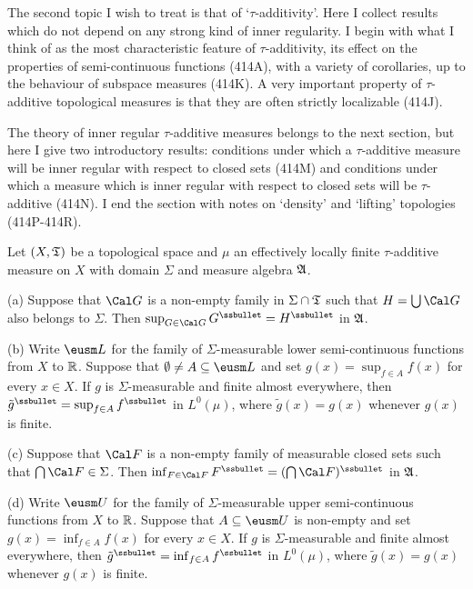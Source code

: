 
\def\chaptername{Topologies and measures I}
\def\sectionname{$\tau$-additivity}
\def\IMPLY#1#2{{\bf (#1)$\Rightarrow$(#2)}}
\def\undphi{\underline{\phi}}
\def\undpsi{\underline{\psi}}


The second topic I wish to treat is that of `$\tau$-additivity'.   Here
I collect results which do not depend on any strong kind of inner
regularity.   I begin with what I think of as the most characteristic
feature of $\tau$-additivity, its effect on the properties of
semi-continuous functions (414A), with a variety of corollaries, up to
the behaviour of subspace measures
(414K).   A very important property of $\tau$-additive topological
measures is that they are often strictly localizable (414J).

The theory of inner regular
$\tau$-additive measures belongs to the next section, but here I give
two introductory results:  conditions under which a $\tau$-additive
measure will be inner regular with respect to closed sets (414M) and
conditions under which a measure which is inner regular
with respect to closed sets will be $\tau$-additive (414N).   I end the
section with notes on `density' and `lifting' topologies (414P-414R).

 Let $(X,\frak T)$ be a topological space and
$\mu$ an effectively locally finite $\tau$-additive measure on $X$ with
domain $\Sigma$ and measure algebra $\frak A$.

(a) Suppose that $\Cal G$ is a non-empty family in $\Sigma\cap\frak T$
such that $H=\bigcup\Cal G$ also belongs to $\Sigma$.   Then
$\sup_{G\in\Cal G}G^{\ssbullet}=H^{\ssbullet}$ in $\frak A$.

(b) Write $\eusm L$ for the family of
$\Sigma$-measurable lower semi-continuous functions from $X$ to
$\Bbb R$.   Suppose that
$\emptyset\ne A\subseteq\eusm L$ and set $g(x)=\sup_{f\in A}f(x)$ for
every $x\in X$.   If $g$ is $\Sigma$-measurable and finite almost
everywhere, then $\tilde g^{\ssbullet}=\sup_{f\in A}f^{\ssbullet}$ in
$L^0(\mu)$, where $\tilde g(x)=g(x)$ whenever $g(x)$ is finite.

(c) Suppose that $\Cal F$ is a non-empty family of measurable closed
sets such that $\bigcap\Cal F\in\Sigma$.   Then
$\inf_{F\in\Cal F}F^{\ssbullet}=(\bigcap\Cal F)^{\ssbullet}$ in
$\frak A$.

(d) Write $\eusm U$ for the family of
$\Sigma$-measurable upper semi-continuous functions from $X$ to
$\Bbb R$.   Suppose that $A\subseteq\eusm U$ is non-empty and set
$g(x)=\inf_{f\in A}f(x)$ for every $x\in X$.   If $g$ is
$\Sigma$-measurable and finite almost everywhere, then
$\tilde g^{\ssbullet}=\inf_{f\in A}f^{\ssbullet}$ in $L^0(\mu)$, where
$\tilde g(x)=g(x)$ whenever $g(x)$ is finite.

